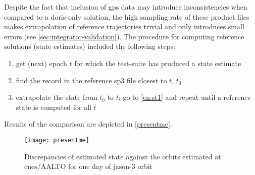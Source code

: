 Despite the fact that inclusion of \gls{gps} data may introduce inconsistencies 
when compared to a \gls{doris}-only solution, the high sampling rate of these 
product files makes extrapolation of reference trajectories trivial and only introduces 
small errors (see \autoref{sec:integrator-validation}). The procedure for computing 
reference solutions (state estimates) included the following steps:
\begin{enumerate}
  \item \label{en:st1} get (next) epoch $t$ for which the test-suite has produced a state estimate
  \item find the record in the reference sp3 file closest to $t$, $t_0$
  \item extrapolate the state from $t_0$ to $t$; go to \autoref{en:st1} and repeat 
    until a reference state is computed for all $t$
\end{enumerate}

Results of the comparison are depicted in \autoref{presentme}.
\begin{figure}
    \centering
    \texttt{[image: presentme]}
    \caption{Discrepancies of estimated state against the orbits estimated at \gls{cnes}/AALTO for one day of \gls{jason}-3 orbit}
    \label{fig:presentme}
\end{figure}
